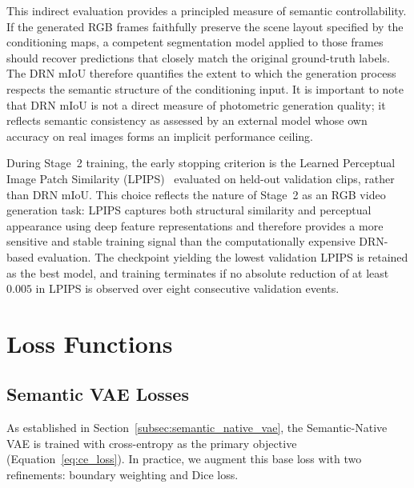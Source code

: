 This indirect evaluation provides a principled measure of semantic controllability. If the generated RGB frames faithfully preserve the scene layout specified by the conditioning maps, a competent segmentation model applied to those frames should recover predictions that closely match the original ground-truth labels. The DRN mIoU therefore quantifies the extent to which the generation process respects the semantic structure of the conditioning input. It is important to note that DRN mIoU is not a direct measure of photometric generation quality; it reflects semantic consistency as assessed by an external model whose own accuracy on real images forms an implicit performance ceiling.

During Stage~2 training, the early stopping criterion is the Learned Perceptual Image Patch Similarity (LPIPS)~\cite{zhang2018unreasonable} evaluated on held-out validation clips, rather than DRN mIoU. This choice reflects the nature of Stage~2 as an RGB video generation task: LPIPS captures both structural similarity and perceptual appearance using deep feature representations and therefore provides a more sensitive and stable training signal than the computationally expensive DRN-based evaluation. The checkpoint yielding the lowest validation LPIPS is retained as the best model, and training terminates if no absolute reduction of at least $0.005$ in LPIPS is observed over eight consecutive validation events.

\FloatBarrier
\section{Loss Functions}
\label{sec:losses}

\subsection{Semantic VAE Losses}
\label{subsec:vae_losses}

As established in Section~\ref{subsec:semantic_native_vae}, the Semantic-Native VAE is trained with cross-entropy as the primary objective (Equation~\ref{eq:ce_loss}). In practice, we augment this base loss with two refinements: boundary weighting and Dice loss.

